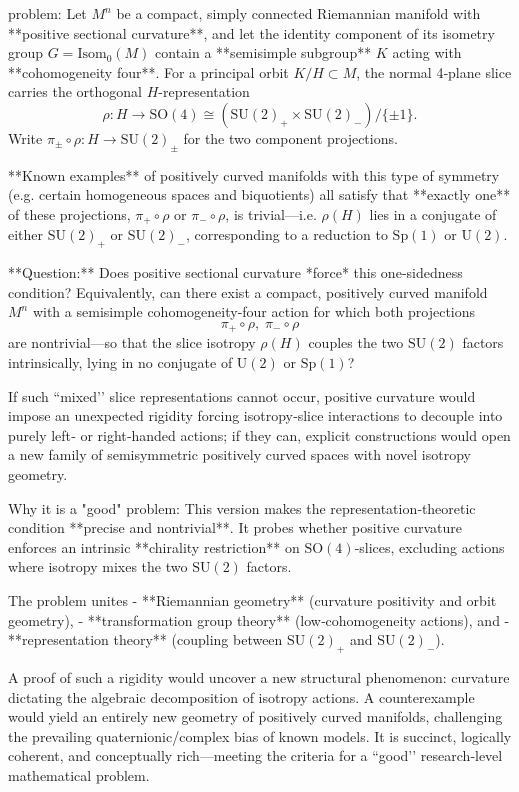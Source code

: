 problem:  
Let \( M^n \) be a compact, simply connected Riemannian manifold with **positive sectional curvature**, and let the identity component of its isometry group \(G = \mathrm{Isom}_0(M)\) contain a **semisimple subgroup** \( K \) acting with **cohomogeneity four**.  For a principal orbit \( K/H \subset M \), the normal 4‑plane slice carries the orthogonal \(H\)-representation  
\[
\rho: H \to \mathrm{SO}(4) \cong (\mathrm{SU}(2)_+\times \mathrm{SU}(2)_-)/\{\pm 1\}.
\]  
Write \(\pi_\pm\circ\rho : H \to \mathrm{SU}(2)_\pm\) for the two component projections.  

**Known examples** of positively curved manifolds with this type of symmetry (e.g. certain homogeneous spaces and biquotients) all satisfy that **exactly one** of these projections, \(\pi_+\circ\rho\) or \(\pi_-\circ\rho\), is trivial—i.e. \(\rho(H)\) lies in a conjugate of either \(\mathrm{SU}(2)_+\) or \(\mathrm{SU}(2)_-\), corresponding to a reduction to \(\mathrm{Sp}(1)\) or \(\mathrm{U}(2)\).

**Question:**  
Does positive sectional curvature *force* this one‑sidedness condition?  
Equivalently, can there exist a compact, positively curved manifold \(M^n\) with a semisimple cohomogeneity‑four action for which both projections  
\[
\pi_+\circ\rho,\; \pi_-\circ\rho
\]
are nontrivial—so that the slice isotropy \(\rho(H)\) couples the two \(\mathrm{SU}(2)\) factors intrinsically, lying in no conjugate of \(\mathrm{U}(2)\) or \(\mathrm{Sp}(1)\)?  

If such “mixed’’ slice representations cannot occur, positive curvature would impose an unexpected rigidity forcing isotropy‑slice interactions to decouple into purely left‑ or right‑handed actions; if they can, explicit constructions would open a new family of semisymmetric positively curved spaces with novel isotropy geometry.

Why it is a "good" problem:  
This version makes the representation‑theoretic condition **precise and nontrivial**.  It probes whether positive curvature enforces an intrinsic **chirality restriction** on \(\mathrm{SO}(4)\)‑slices, excluding actions where isotropy mixes the two \(\mathrm{SU}(2)\) factors.  

The problem unites  
- **Riemannian geometry** (curvature positivity and orbit geometry),  
- **transformation group theory** (low‑cohomogeneity actions), and  
- **representation theory** (coupling between \(\mathrm{SU}(2)_+\) and \(\mathrm{SU}(2)_-\)).  

A proof of such a rigidity would uncover a new structural phenomenon: curvature dictating the algebraic decomposition of isotropy actions. A counterexample would yield an entirely new geometry of positively curved manifolds, challenging the prevailing quaternionic/complex bias of known models.  
It is succinct, logically coherent, and conceptually rich—meeting the criteria for a “good’’ research‑level mathematical problem.
